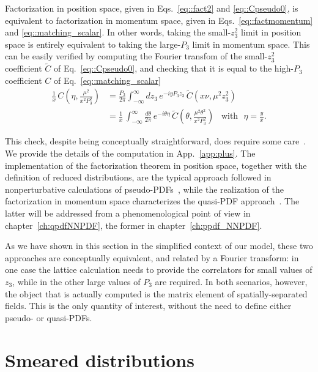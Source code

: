 Factorization in position space, given in Eqs.~\eqref{eq::fact2} and
\eqref{eq::Cpseudo0}, is equivalent to factorization in momentum space, given in
Eqs.~\eqref{eq::factmomentum} and \eqref{eq::matching_scalar}. In other words, taking
the small-$z_3^2$ limit in position space is entirely equivalent to taking the
large-$P_3$ limit in momentum space. This can be easily verified by computing
the Fourier transfom of the small-$z_3^2$ coefficient $\tilde{C}$ of
Eq.~\eqref{eq::Cpseudo0}, and checking that it is equal to the high-$P_3$
coefficient $C$ of Eq.~\eqref{eq::matching_scalar} 
\begin{align}
	\label{eq::check}
	\frac{1}{x}\,C\left(\eta,\frac{\mu^2}{x^2 P_3^2}\right) &= 
	\frac{P_3}{2\pi}\int_{-\infty}^{\infty} dz_3\, e^{-i y P_3 z_3 }\,
	\tilde{C}\left(x\nu, \mu^2 z_3^2 \right) \nonumber \\
	&= \frac{1}{x}\,\int_{-\infty}^{\infty}\frac{d\theta}{2\pi}\, e^{-i\theta\eta}\,
	\tilde{C}\left(\theta, \frac{\mu^2\theta^2}{x^2 P_3^2} \right)\,\,\,\,\, \text{with}\,\,\,\, \eta = \frac{y}{x}.
\end{align}

This check, despite being conceptually straightforward, does require some
care~\cite{Izubuchi:2018srq}. We provide the details of the computation in
App.~\ref{app:plus}.
%
The implementation of the factorization theorem in position space, together with
the definition of reduced distributions, are the typical approach followed in nonperturbative calculations of
pseudo-PDFs~\cite{Radyushkin:2017cyf,Orginos:2017kos,Joo:2019jct,Joo:2019bzr,Joo:2020spy,
Radyushkin:2019owq}, while the realization of the factorization in momentum
space characterizes the quasi-PDF
approach~\cite{PhysRevLett.110.262002,Alexandrou:2018pbm, Alexandrou:2019lfo,
Chai:2020nxw, Bhat:2020ktg}. The latter will be addressed from a phenomenological point of 
view in chapter~\ref{ch:qpdfNNPDF}, the former in chapter~\ref{ch:ppdf_NNPDF}.

As we have shown in this section in the simplified context of our model, these
two approaches are conceptually equivalent, and related by a Fourier transform:
in one case the lattice calculation needs to provide the correlators for  small
values of $z_3$, while in the other large values of $P_3$ are required. In both
scenarios, however, the object that is actually computed is the matrix element
of spatially-separated fields. This is the only quantity of interest, without
the need to define either pseudo- or quasi-PDFs.

\section{Smeared distributions}
\label{sec:flow}

